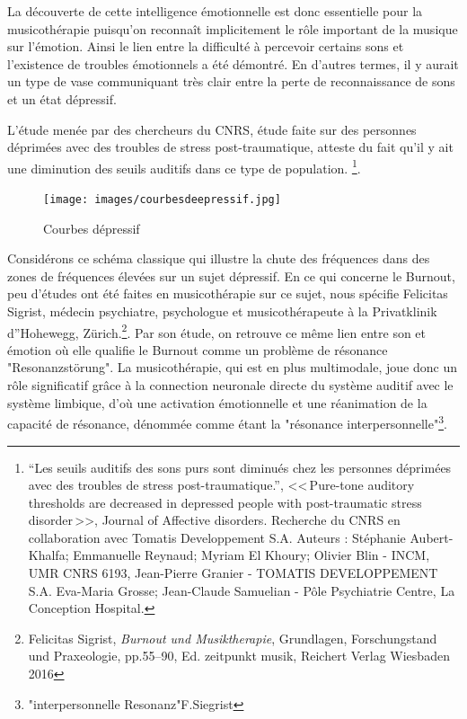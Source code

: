 La découverte de cette intelligence  émotionnelle est donc essentielle  pour la 
musicothérapie puisqu'on reconnaît implicitement le rôle important de la musique sur 
l'émotion.   
Ainsi le lien entre la difficulté à percevoir certains sons 
et l'existence 
de troubles émotionnels a été démontré. En d'autres termes, il y
aurait un type de vase communiquant très clair entre la perte de reconnaissance de sons et
un état dépressif.

L'étude menée par des chercheurs du CNRS, étude faite
sur des personnes déprimées avec des troubles de stress post-traumatique, atteste du 
fait qu'il y ait une diminution des seuils auditifs dans ce type de
population.
\footnote{``Les seuils auditifs des sons purs 
	sont diminués chez les personnes déprimées avec des
	troubles de stress post-traumatique.'', <<\,Pure-tone auditory 
	thresholds are decreased in depressed people with post-traumatic stress 
disorder\,>>, Journal of Affective disorders. Recherche du CNRS en collaboration
	avec Tomatis Developpement S.A. Auteurs : Stéphanie 
	Aubert-Khalfa; Emmanuelle Reynaud; Myriam El Khoury;
	Olivier Blin - INCM, UMR CNRS 6193, Jean-Pierre Granier -
	TOMATIS DEVELOPPEMENT S.A. Eva-Maria Grosse; Jean-Claude 
	Samuelian - Pôle Psychiatrie Centre, La Conception Hospital.}.

 
\begin{figure}
	\centering
	\texttt{[image: images/courbesdeepressif.jpg]}
	\caption{Courbes dépressif}
	\label{fig:courbes du dépressif}
      \end{figure}


Considérons ce schéma classique qui illustre la
chute des fréquences dans des zones de fréquences élevées sur un sujet
dépressif.
En ce qui concerne le Burnout,  peu d'études ont été  faites en musicothérapie
sur ce sujet, nous spécifie Felicitas Sigrist, médecin
psychiatre, psychologue et musicothérapeute à la Privatklinik
d''Hohewegg, Zürich.\footnote{Felicitas Sigrist,  
\textit{Burnout und 
		Musiktherapie}, Grundlagen, Forschungstand und Praxeologie, pp.55--90, Ed. 
	zeitpunkt musik, Reichert Verlag Wiesbaden 2016}. Par son étude, on retrouve ce 
	même lien entre son et 
émotion où elle qualifie le Burnout comme un problème de résonance "Resonanzstörung". La 
musicothérapie, qui est en plus multimodale, joue donc un rôle significatif grâce à la 
connection 
neuronale directe du système auditif avec le système limbique, d'où une activation 
émotionnelle et une  réanimation de  la capacité de résonance, dénommée comme 
étant la 
"résonance interpersonnelle"\footnote{"interpersonnelle Resonanz"F.Siegrist}.

